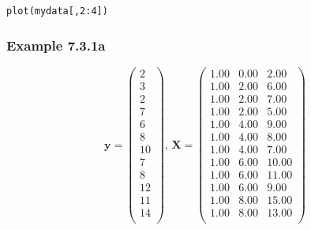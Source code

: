 \documentclass[11pt]{article}
\begin{document}
\begin{verbatim}
plot(mydata[,2:4])
\end{verbatim}
\subsubsection{Example 7.3.1a}
\label{sec-1-1-3}



$$\mathbf{y}=
\begin{pmatrix}{}
    2 \\ 
    3 \\ 
    2 \\ 
    7 \\ 
    6 \\ 
    8 \\ 
   10 \\ 
    7 \\ 
    8 \\ 
   12 \\ 
   11 \\ 
   14 \\ 
  \end{pmatrix}, \, 
\mathbf{X} = %
\begin{pmatrix}{}
  1.00 & 0.00 & 2.00 \\ 
  1.00 & 2.00 & 6.00 \\ 
  1.00 & 2.00 & 7.00 \\ 
  1.00 & 2.00 & 5.00 \\ 
  1.00 & 4.00 & 9.00 \\ 
  1.00 & 4.00 & 8.00 \\ 
  1.00 & 4.00 & 7.00 \\ 
  1.00 & 6.00 & 10.00 \\ 
  1.00 & 6.00 & 11.00 \\ 
  1.00 & 6.00 & 9.00 \\ 
  1.00 & 8.00 & 15.00 \\ 
  1.00 & 8.00 & 13.00 \\ 
  \end{pmatrix}
$$
\end{document}

